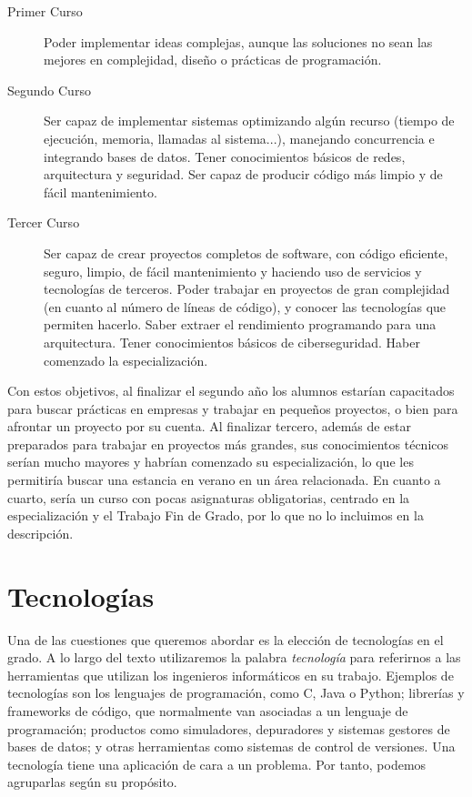\begin{description}
    \item[Primer Curso] Poder implementar ideas complejas,
    aunque las soluciones no sean las mejores en
    complejidad, diseño o prácticas de programación.

    \item[Segundo Curso] Ser capaz de implementar sistemas
    optimizando algún recurso
    (tiempo de ejecución, memoria, llamadas al sistema...),
    manejando concurrencia e
    integrando bases de datos.
    Tener conocimientos básicos de redes, arquitectura y seguridad.
    Ser capaz de producir código más limpio y de fácil mantenimiento.

    \item[Tercer Curso] Ser capaz de crear proyectos completos de software,
    con código eficiente, seguro, limpio, de fácil mantenimiento y
    haciendo uso de servicios y tecnologías de terceros.
    Poder trabajar en proyectos de gran complejidad
    (en cuanto al número de líneas de código),
    y conocer las tecnologías que permiten hacerlo.
    Saber extraer el rendimiento programando para una arquitectura.
    Tener conocimientos básicos de ciberseguridad.
    Haber comenzado la especialización.
\end{description}

Con estos objetivos,
al finalizar el segundo año los alumnos estarían capacitados para
buscar prácticas en empresas y trabajar en pequeños proyectos,
o bien para afrontar un proyecto por su cuenta.
Al finalizar tercero,
además de estar preparados para trabajar en proyectos más grandes,
sus conocimientos técnicos serían mucho mayores y
habrían comenzado su especialización,
lo que les permitiría buscar una estancia en verano en un área relacionada.
En cuanto a cuarto, sería un curso con pocas asignaturas obligatorias,
centrado en la especialización y el Trabajo Fin de Grado,
por lo que no lo incluimos en la descripción.

\section{Tecnologías}

Una de las cuestiones que queremos abordar es
la elección de tecnologías en el grado.
A lo largo del texto utilizaremos la palabra \emph{tecnología} para referirnos a
las herramientas que utilizan los ingenieros informáticos en su trabajo.
Ejemplos de tecnologías son
los lenguajes de programación,
como C, Java o Python;
librerías y frameworks de código,
que normalmente van asociadas a un lenguaje de programación;
productos como simuladores, depuradores y sistemas gestores de bases de datos; y
otras herramientas como sistemas de control de versiones.
Una tecnología tiene una aplicación de cara a un problema.
Por tanto, podemos agruparlas según su propósito.

